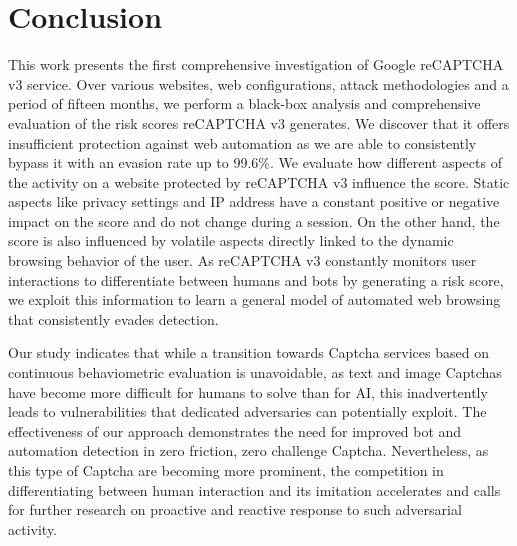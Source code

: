 \section{Conclusion}
\label{sec:conclusion}
This work presents the first comprehensive investigation of Google reCAPTCHA v3 service.
Over various websites, web configurations, attack methodologies and a period of fifteen months, we perform a black-box analysis and comprehensive evaluation of the risk scores reCAPTCHA v3 generates.
We discover that it offers insufficient protection against web automation as we are able to consistently bypass it with an evasion rate up to 99.6\%.
We evaluate how different aspects of the activity on a website protected by reCAPTCHA v3 influence the score.
Static aspects like privacy settings and IP address have a constant positive or negative impact on the score and do not change during a session.
On the other hand, the score is also influenced by volatile aspects directly linked to the dynamic browsing behavior of the user.
As reCAPTCHA v3 constantly monitors user interactions to differentiate between humans and bots by generating a risk score, we exploit this information to learn a general model of automated web browsing that consistently evades detection.

Our study indicates that while a transition towards Captcha services based on continuous behaviometric evaluation is unavoidable, as text and image Captchas have become more difficult for humans to solve than for AI, this inadvertently leads to vulnerabilities that dedicated adversaries can potentially exploit.
The effectiveness of our approach demonstrates the need for improved bot and automation detection in zero friction, zero challenge Captcha.
Nevertheless, as this type of Captcha are becoming more prominent, the competition in differentiating between human interaction and its imitation accelerates and calls for further research on proactive and reactive response to such adversarial activity.